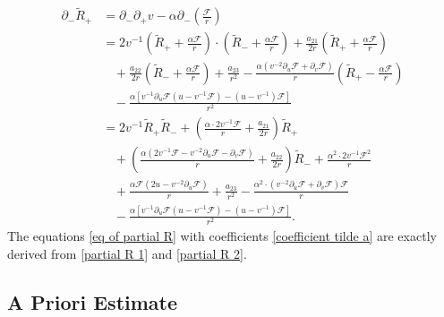 \documentclass[10pt,leqno]{amsart}
\numberwithin{equation}{section}
\begin{document}
\begin{equation} \label{partial R 2}
	\begin{aligned}
		\partial_{-} \tilde{R}_{+} & =  \partial_{-} \partial_{+} v - \alpha \partial_{-} \left( \frac{ \mathcal{F}}{r} \right) \\
		& = 2v^{-1} \left( \tilde{R}_{+ } + \frac{\alpha \mathcal{F}}{r} \right) \cdot \left( \tilde{R}_{-} + \frac{\alpha \mathcal{F}}{r} \right)  + \frac{a_{21}}{2r} \left(\tilde{R}_{+} + \frac{\alpha \mathcal{F}}{r} \right)  \\
		& \ \ \ \  + \frac{a_{22}}{2r} \left(\tilde{R}_{- } + \frac{\alpha \mathcal{F}}{r} \right) +\frac{a_{23}}{r^{2}}  - \frac{\alpha( v^{-2} \partial_{u} \mathcal{F} + \partial_{v} \mathcal{F}  )}{r} \left( \tilde{R}_{+ } - \frac{\alpha \mathcal{F}}{r} \right) \\
		& \ \ \ \ - \frac{\alpha[v^{-1} \partial_{u} \mathcal{F}  (u-v^{-1}\mathcal{F}  ) - (u-v^{-1})\mathcal{F} ] }{r^2} \\
		& = 2v^{-1}\tilde{R}_{+ } \tilde{R}_{-} + \left( \frac{\alpha \cdot 2v^{-1} \mathcal{F} }{r} +\frac{a_{21}}{2r} \right) \tilde{R}_{+} \\
		& \ \ \ \  +\left( \frac{\alpha ( 2v^{-1}\mathcal{F} - v^{-2}\partial_{u}\mathcal{F} - \partial_{v}\mathcal{F})}{r} + \frac{a_{22}}{2r} \right)  \tilde{R}_{- }  + \frac{\alpha^{2} \cdot 2v^{-1} \mathcal{F}^{2} }{r} \\
		& \ \ \ \ + \frac{\alpha \mathcal{F} (2u - v^{-2} \partial_{u}\mathcal{F} ) }{r} +\frac{a_{23}}{r^{2}}   - \frac{\alpha^{2} \cdot ( v^{-2} \partial_{u} \mathcal{F} + \partial_{v} \mathcal{F}  )  \mathcal{F} }{r}\\
		& \ \ \ \  - \frac{\alpha[v^{-1} \partial_{u} \mathcal{F}  (u-v^{-1}\mathcal{F}  ) - (u-v^{-1})\mathcal{F} ] }{r^2}.
	\end{aligned}
\end{equation}	
The equations \eqref{eq of partial R} with coefficients \eqref{coefficient tilde a} are exactly derived from \eqref{partial R 1} and \eqref{partial R 2}.







\subsection{A Priori Estimate}
\end{document}
